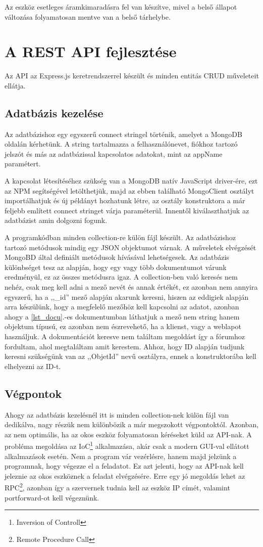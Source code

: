 \documentclass{thesis-ekf}
\theoremstyle{definition}
\theoremstyle{remark}
\begin{document}
	  Az eszköz esetleges áramkimaradásra fel van készítve, mivel a belső állapot változása folyamatosan mentve van a belső tárhelybe.
	\chapter{A REST API fejlesztése}
	\label{ch_API}
	Az API az Express.js keretrendszerrel készült és minden entitás CRUD műveleteit ellátja.
	\section{Adatbázis kezelése}
	Az adatbázishoz egy egyszerű connect stringel történik, amelyet a MongoDB oldalán kérhetünk. A string tartalmazza a felhasználónevet, fiókhoz tartozó jelszót és más az adatbázissal kapcsolatos adatokat, mint az appName paramétert.
	
	A kapcsolat létesítéséhez szükség van a MongoDB natív JavaScript driver-ére, ezt az NPM segítségével letölthetjük, majd az ebben található MongoClient osztályt importálhatjuk és új példányt hozhatunk létre, az osztály konstruktora a már feljebb említett connect stringet várja paraméterül. Innentől kiválaszthatjuk az adatbázist amin dolgozni fogunk.
	
	A programkódban minden collection-re külön fájl készült.  Az adatbázishoz tartozó metódusok mindig egy JSON objektumot várnak. A műveletek elvégzését MongoBD által definiált metódusok hívásával lehetségesek. Az adatbázis különbséget tesz az alapján, hogy egy vagy több dokumentumot várunk eredményül, ez az összes metódusra igaz. A collection-ben való keresés nem nehéz, csak meg kell adni a mező nevét és annak értékét, ez azonban nem annyira egyszerű, ha a ,,\_id'' mező alapján akarunk keresni, hiszen az eddigiek alapján arra készülünk, hogy a megfelelő mezőhöz kell kapcsolni az adatot, azonban ahogy a \ref{lst_docu}.-es dokumentumban láthatjuk a mező nem string hanem objektum típusú, ez azonban nem észrevehető, ha a klienst, vagy a weblapot használjuk. A dokumentációt\cite{bib_mongo_docs} keresve nem találtam megoldást így a fórumhoz\cite{bib_mongo_forum} fordultam, ahol megtaláltam amit kerestem. Ahhoz, hogy ID alapján tudjunk keresni szükségünk van az ,,ObjetId'' nevű osztályra, ennek a konstruktorába kell elhelyezni az ID-t.
	
	\section{Végpontok}
	Ahogy az adatbázis kezelésnél itt is minden collection-nek külön fájl van dedikálva, nagy részük nem különbözik a már megszokott végpontoktól. Azonban, az nem optimális, ha az okos eszköz folyamatosan kéréseket küld az API-nak. A probléma megoldása az IoC\footnote{Inversion of Controll} alkalmazása, akár csak a modern GUI-val ellátott alkalmazások esetén. Nem a program vár vezérlésre, hanem majd jelzünk a programnak, hogy végezze el a feladatot. Ez azt jelenti, hogy az API-nak kell jeleznie az okos eszköznek a feladat elvégzésére. Erre egy jó megoldás lehet az RPC\footnote{Remote Procedure Call}, azonban így a szervernek tudnia kell az eszköz IP címét, valamint portforward-ot kell végeznünk.
\end{document}
